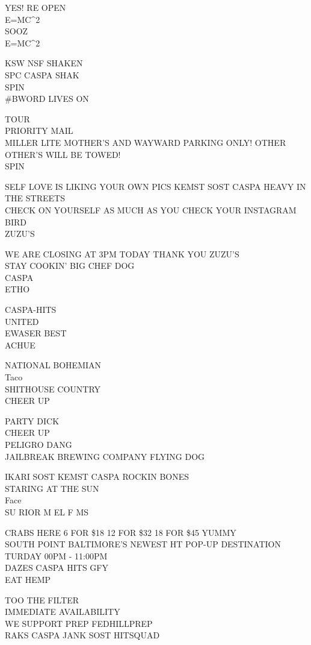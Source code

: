 \documentclass[10pt,letterpaper]{article}
\begin{document}
YES!  RE OPEN\\
E=MC\^{}2\\
SOOZ\\
E=MC\^{}2

KSW NSF SHAKEN\\
SPC CASPA SHAK\\
SPIN\\
\#BWORD LIVES ON

TOUR\\
PRIORITY MAIL\\
MILLER LITE MOTHER'S AND WAYWARD PARKING ONLY!  OTHER OTHER'S WILL BE TOWED!\\
SPIN

SELF LOVE IS LIKING YOUR OWN PICS KEMST SOST CASPA HEAVY IN THE STREETS\\
CHECK ON YOURSELF AS MUCH AS YOU CHECK YOUR INSTAGRAM\\
BIRD\\
ZUZU'S

WE ARE CLOSING AT 3PM TODAY THANK YOU ZUZU'S\\
STAY COOKIN' BIG CHEF DOG\\
CASPA\\
ETHO

CASPA{-}HITS\\
UNITED\\
EWASER BEST\\
ACHUE

NATIONAL BOHEMIAN\\
Taco\\
SHITHOUSE COUNTRY\\
CHEER UP

PARTY DICK\\
CHEER UP\\
PELIGRO DANG\\
JAILBREAK BREWING COMPANY FLYING DOG

IKARI SOST KEMST CASPA ROCKIN BONES\\
STARING AT THE SUN\\
Face\\
SU RIOR M EL F MS

CRABS HERE 6 FOR \$18 12 FOR \$32 18 FOR \$45 YUMMY\\
SOUTH POINT BALTIMORE'S NEWEST HT POP{-}UP DESTINATION TURDAY 00PM {-} 11:00PM\\
DAZES CASPA HITS GFY\\
EAT HEMP

TOO THE FILTER\\
IMMEDIATE AVAILABILITY\\
WE SUPPORT PREP FEDHILLPREP\\
RAKS CASPA JANK SOST HITSQUAD
\end{document}
